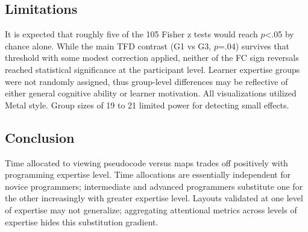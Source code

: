 \documentclass[journal]{vgtc}
\begin{document}
\subsection{Limitations}

It is expected that roughly five of the 105 Fisher z tests would
reach $p$<.05 by chance alone. While the main TFD contrast (G1 vs
G3, $p$=.04) survives that threshold with some modest correction
applied, neither of the FC sign reversals reached statistical
significance at the participant level. Learner expertise groups were
not randomly assigned, thus group-level differences may be reflective
of either general cognitive ability or learner motivation. All
visualizations utilized Metal style. Group sizes of 19 to 21 limited
power for detecting small effects.

\subsection{Conclusion}

Time allocated to viewing pseudocode versus maps trades off
positively with programming expertise level. Time allocations are
essentially independent for novice programmers; intermediate and
advanced programmers substitute one for the other increasingly with
greater expertise level. Layouts validated at one level of expertise
may not generalize; aggregating attentional metrics across levels of
expertise hides this substitution gradient.




\end{document}
